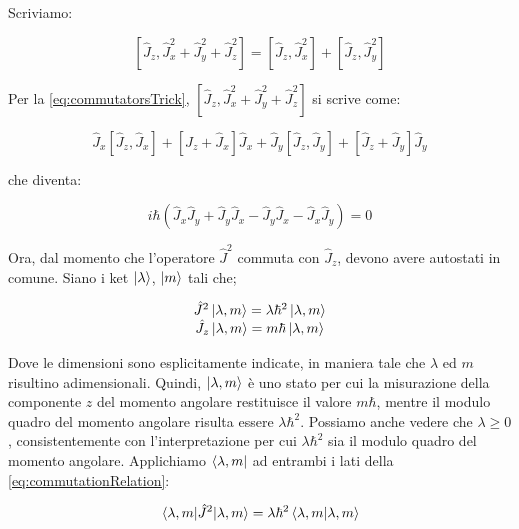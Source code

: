 Scriviamo:

	\begin{equation}
		\left [ \hat{J}_z, \hat{J}_x^2 + \hat{J}_y^2 + \hat{J}_z^2 \right ] = \left [ \hat{J}_z, \hat{J}_x^2 \right ] + \left [ \hat{J}_z, \hat{J}_y^2 \right ]
	\end{equation}

Per la \eqref{eq:commutatorsTrick}, $\left [ \hat{J}_z, \hat{J}_x^2 + \hat{J}_y^2 + \hat{J}_z^2 \right ]$ si scrive come:

	\begin{equation}
	 \hat{J}_x \left [ \hat{J}_z, \hat{J}_x \right ] + \left [ \hat{J}_z + \hat{J}_x \right ] \hat{J}_x + \hat{J}_y \left [ \hat{J}_z, \hat{J}_y \right ] + \left [ \hat{J}_z + \hat{J}_y \right ] \hat{J}_y 
	\end{equation}

che diventa:

	\begin{equation}
		i \hbar \left ( \hat{J}_x \hat{J}_y + \hat{J}_y \hat{J}_x - \hat{J}_y \hat{J}_x - \hat{J}_x \hat{J}_y \right ) = 0
	\end{equation}

Ora, dal momento che l'operatore $\hat{J}^2$ commuta con $\hat{J}_z$, devono avere autostati in comune. Siano i ket $\ket{\lambda}$, $\ket{m}$ tali che;

	\begin{equation} \label{eq:commutationRelation}
		\begin{array} {c}
			\hat{J}^2 \ket{\lambda, m} = \lambda \hbar^2 \ket{\lambda, m} \\
			\hat{J}_z \ket{\lambda, m} = m \hbar \ket{\lambda, m}
		\end{array}
	\end{equation}

Dove le dimensioni sono esplicitamente indicate, in maniera tale che $\lambda$ ed $m$ risultino adimensionali. Quindi, $\ket{\lambda, m}$ \`e uno stato per cui la misurazione della componente $z$ del momento angolare restituisce il valore $m \hbar$, mentre il modulo quadro del momento angolare risulta essere $\lambda \hbar^2$. Possiamo anche vedere che $\lambda \ge 0$, consistentemente con l'interpretazione per cui $\lambda \hbar^2$ sia il modulo quadro del momento angolare. Applichiamo $\bra{\lambda, m}$ ad entrambi i lati della \eqref{eq:commutationRelation}:

	\begin{equation}
		\mel{\lambda, m}{\hat{J}^2}{\lambda, m} = \lambda \hbar^2 \braket{\lambda, m}{\lambda, m}
	\end{equation}


